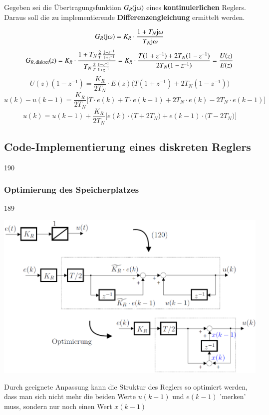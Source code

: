 
Gegeben sei die Übertragungsfunktion $G_R(\mathrm{j} \omega)$ eines \textbf{kontinuierlichen} Reglers.
Daraus soll die zu implementierende \textbf{Differenzengleichung} ermittelt werden.

$$ G_R(\mathrm{j} \omega) = K_R \cdot \frac{1 + T_N \mathrm{j} \omega}{T_N \mathrm{j} \omega} $$
$$ G_{R, \, \rm diskret}(z) = K_R \cdot \frac{1 + T_N \frac{2}{T} \frac{1- z^{-1}}{1 + z^{-1}}}{T_N \frac{2}{T} \frac{1- z^{-1}}{1 + z^{-1}}} 
    = K_R \cdot \frac{T (1 + z^{-1}) + 2 T_N (1 - z^{-1})}{2 T_N (1- z^{-1})} = \frac{U(z)}{E(z)} $$
$$ U(z) (1 - z^{-1}) = \frac{K_R}{2 T_N} \cdot E(z) \Big( T (1 + z^{-1}) + 2 T_N (1 - z^{-1}) \Big) $$
$$ u(k) - u(k-1) = \frac{K_R}{2 T_N} \Big[ T \cdot e(k) + T \cdot e(k-1) + 2 T_N \cdot e(k) - 2 T_N \cdot e(k-1) \Big] $$
$$ u(k) = u(k-1) + \frac{K_R}{2 T_N} \Big[ e(k) \cdot \big( T + 2 T_N  \big) +  e(k-1) \cdot \big( T - 2 T_N  \big)  \Big]  $$


\subsection{Code-Implementierung eines diskreten Reglers}{190}




\subsubsection{Optimierung des Speicherplatzes}{189}

\begin{minipage}[c]{0.48\columnwidth}
     \includegraphics[width=\columnwidth]{images/optimierung_speicherplatz.png}
\end{minipage}
\hfill
\begin{minipage}[c]{0.48\columnwidth}
    Durch geeignete Anpassung kann die Struktur des Reglers so optimiert werden, dass man sich nicht mehr die beiden Werte $u(k-1)$ und $e(k-1)$
    'merken' muss, sondern nur noch einen Wert $x(k-1)$
\end{minipage}


